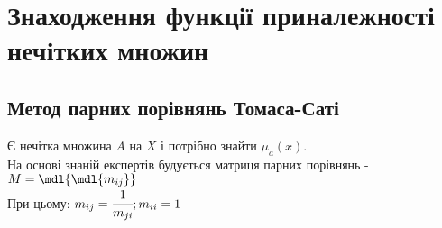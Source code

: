 \section{Знаходження функції приналежності нечітких множин} 
\subsection{Метод парних порівнянь Томаса-Саті}
Є нечітка множина $A$ на $X$ і потрібно знайти $\mu_a(x)$.\\
На основі знаній експертів будується матриця парних порівнянь -  $M=\mdl{\mdl{m_{ij}}}$\\
При цьому: $m_{ij}=\cfrac1{m_{ji}};m_{ii}=1$\\


